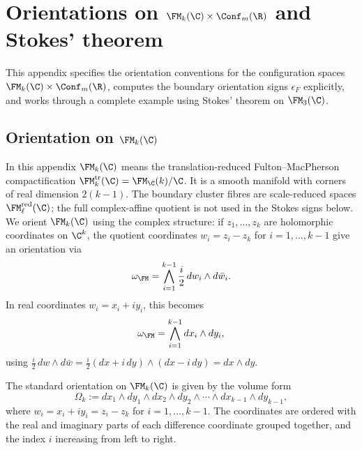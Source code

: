 \section{\texorpdfstring{Orientations on $\FM_k(\C)\times \Conf_m(\R)$ and Stokes' theorem}{Orientations on FM k(C) x Conf m(R) and Stokes' theorem}}
\label{app:orientations}

This appendix specifies the orientation conventions for the configuration spaces $\FM_k(\C) \times \Conf_m(\R)$, computes the boundary orientation signs $\epsilon_F$ explicitly, and works through a complete example using Stokes' theorem on $\FM_3(\C)$.

\subsection{\texorpdfstring{Orientation on $\FM_k(\C)$}{Orientation on FM k(C)}}
\label{subsec:orient-FM}

In this appendix \(\FM_k(\C)\) means the translation-reduced
Fulton--MacPherson compactification
\(\FM_k^{\mathrm{tr}}(\C)=\FM_{\C}(k)/\C\). It is a smooth manifold
with corners of real dimension \(2(k-1)\). The boundary cluster fibres
are scale-reduced spaces \(\FM_\ell^{\mathrm{red}}(\C)\); the full
complex-affine quotient is not used in the Stokes signs below. We
orient \(\FM_k(\C)\) using the complex structure: if
\(z_1,\ldots,z_k\) are holomorphic coordinates on \(\C^k\), the
quotient coordinates \(w_i=z_i-z_k\) for \(i=1,\ldots,k-1\) give an
orientation via
\begin{equation}
\label{eq:orient-FM-form}
\omega_{\FM} = \bigwedge_{i=1}^{k-1} \frac{i}{2}\, dw_i \wedge d\bar{w}_i.
\end{equation}
In real coordinates $w_i = x_i + iy_i$, this becomes
\[
\omega_{\FM} = \bigwedge_{i=1}^{k-1} dx_i \wedge dy_i,
\]
using $\frac{i}{2}\,dw \wedge d\bar{w} = \frac{i}{2}(dx+i\,dy)\wedge(dx - i\,dy) = dx\wedge dy$.

\begin{convention}
\label{conv:coord-ordering}
The standard orientation on $\FM_k(\C)$ is given by the volume form
\begin{equation}
\label{eq:vol-FM}
\Omega_k := dx_1 \wedge dy_1 \wedge dx_2 \wedge dy_2 \wedge \cdots \wedge dx_{k-1}\wedge dy_{k-1},
\end{equation}
where $w_i = x_i + iy_i = z_i - z_k$ for $i = 1,\ldots,k-1$. The coordinates are ordered with the real and imaginary parts of each difference coordinate grouped together, and the index $i$ increasing from left to right.
\end{convention}

